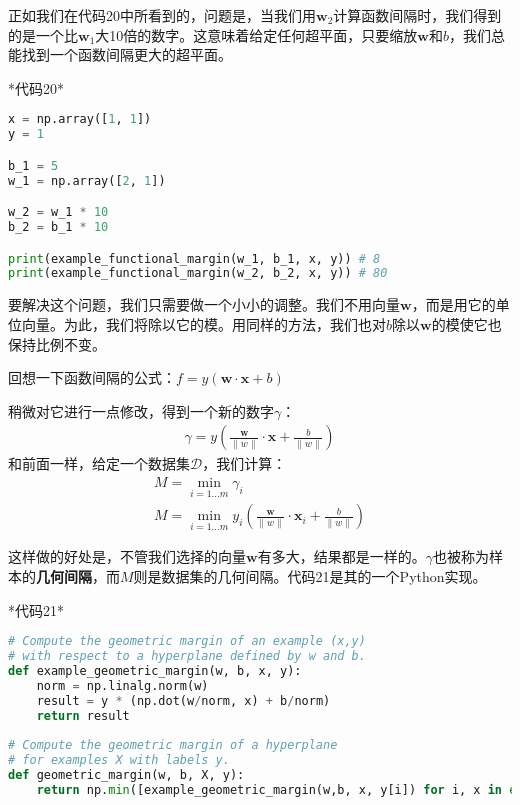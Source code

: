 正如我们在代码20中所看到的，问题是，当我们用$\mathbf{w}_2$计算函数间隔时，我们得到的是一个比$\mathbf{w}_1$大10倍的数字。这意味着给定任何超平面，只要缩放$\mathbf{w}$和$b$，我们总能找到一个函数间隔更大的超平面。

*代码20*

\begin{lstlisting}[language=python]
x = np.array([1, 1]) 
y = 1 

b_1 = 5 
w_1 = np.array([2, 1]) 

w_2 = w_1 * 10 
b_2 = b_1 * 10 

print(example_functional_margin(w_1, b_1, x, y)) # 8 
print(example_functional_margin(w_2, b_2, x, y)) # 80
\end{lstlisting}

要解决这个问题，我们只需要做一个小小的调整。我们不用向量$\mathbf{w}$，而是用它的单位向量。为此，我们将除以它的模。用同样的方法，我们也对$b$除以$\mathbf{w}$的模使它也保持比例不变。

回想一下函数间隔的公式：$f = y(\mathbf{w}\cdot \mathbf{x} + b)$

稍微对它进行一点修改，得到一个新的数字$\gamma$：
\begin{gather*}
\gamma = y(\frac{\mathbf{w}}{\|w\|}\cdot \mathbf{x} + \frac{b}{\|w\|})
\end{gather*}
和前面一样，给定一个数据集$\mathcal{D}$，我们计算：
\begin{gather*}
M = \min_{i=1\dots m} \gamma_i \\
M = \min_{i=1\dots m} y_i(\frac{\mathbf{w}}{\|w\|}\cdot \mathbf{x}_i + \frac{b}{\|w\|})
\end{gather*}

这样做的好处是，不管我们选择的向量$\mathbf{w}$有多大，结果都是一样的。$\gamma$也被称为样本的\textbf{几何间隔}，而$M$则是数据集的几何间隔。代码21是其的一个Python实现。

*代码21*

\begin{lstlisting}[language=python]
# Compute the geometric margin of an example (x,y) 
# with respect to a hyperplane defined by w and b. 
def example_geometric_margin(w, b, x, y): 
    norm = np.linalg.norm(w) 
    result = y * (np.dot(w/norm, x) + b/norm) 
    return result 
    
# Compute the geometric margin of a hyperplane 
# for examples X with labels y. 
def geometric_margin(w, b, X, y): 
    return np.min([example_geometric_margin(w,b, x, y[i]) for i, x in enumerate(X)])
\end{lstlisting}

